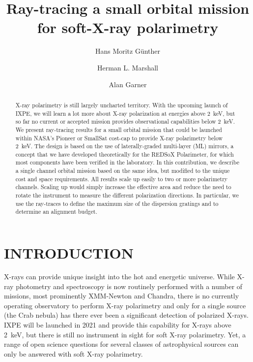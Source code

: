\documentclass[]{spie}  %
\title{Ray-tracing a small orbital mission for soft-X-ray polarimetry}
\author[a]{Hans Moritz G\"unther}
\author[a]{Herman L. Marshall}
\author[a]{Alan Garner}
\affil[a]{MIT Kavli Institute for Astrophysics and Space Research, Massachusetts Institute of Technology, Cambridge, MA 02139, USA}
\begin{document}
 
\maketitle

\begin{abstract}
X-ray polarimetry is still largely uncharted territory. With the
upcoming launch of IXPE, we will learn a lot more about X-ray
polarization at energies above 2~keV, but so far no current or
accepted mission provides observational capabilities below 2~keV. We
present ray-tracing results for a small orbital mission that could be
launched within NASA's Pioneer or SmallSat cost-cap to provide X-ray
polarimetry below 2~keV. The design is based on the use of
laterally-graded multi-layer (ML) mirrors, a concept that we have
developed theoretically for the REDSoX Polarimeter\cite{redsox},
for which most components have been verified in the laboratory.  In this
contribution, we describe a single channel orbital mission based on
the same idea, but modified to the unique cost and space
requirements. All results scale up easily to two or more polarimetry
channels. Scaling up would simply increase the effective area and reduce the
need to rotate the instrument to measure the different polarization
directions. In particular, we use the ray-traces to define the maximum
size of the dispersion gratings and to determine an alignment budget.

\end{abstract}


\section{INTRODUCTION}
\label{sec:intro}
X-rays can provide unique insight into the hot and energetic
universe. While X-ray photometry and spectroscopy is now routinely
performed with a number of missions, most prominently XMM-Newton and
Chandra, there is no currently operating observatory to perform X-ray
polarimetry and only for a single source (the Crab nebula) has there
ever been a significant detection of polarized
X-rays\cite{1972ApJ...174L...1N,1978ApJ...220L.117W}.  IXPE\cite{IXPE}
will be launched in 2021 and provide this capability for X-rays above
2~keV, but there is still no instrument in sight for soft X-ray
polarimetry. Yet, a range of open science questions for several
classes of astrophysical sources can only be answered with soft X-ray
polarimetry.
\end{document}
